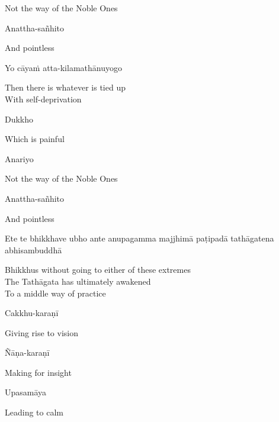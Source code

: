 \begin{english}
  Not the way of the Noble Ones
\end{english}

Anattha-sañhito

\begin{english}
  And pointless
\end{english}

Yo cāyaṁ atta-kilamathānuyogo

\begin{english}
  Then there is whatever is tied up\\
  With self-deprivation
\end{english}

Dukkho

\begin{english}
  Which is painful
\end{english}

Anariyo

\begin{english}
  Not the way of the Noble Ones
\end{english}

Anattha-sañhito

\begin{english}
  And pointless
\end{english}

\begin{pali-hang}
  Ete te bhikkhave ubho ante anupagamma majjhimā paṭipadā tathāgatena abhisambuddhā
\end{pali-hang}

\begin{english-verses}
  Bhikkhus without going to either of these extremes\\
  The Tathāgata has ultimately awakened\\
  To a middle way of practice
\end{english-verses}

Cakkhu-karaṇī

\begin{english}
  Giving rise to vision
\end{english}

Ñāṇa-karaṇī

\begin{english}
  Making for insight
\end{english}

Upasamāya

\begin{english}
  Leading to calm
\end{english}

